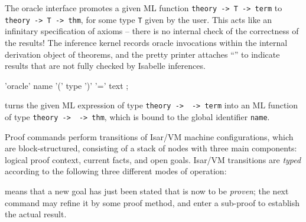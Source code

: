 \begin{isabellebody}
\begin{isamarkuptext}
  The oracle interface promotes a given ML function \verb|theory -> T -> term| to \verb|theory -> T -> thm|, for some
  type \verb|T| given by the user.  This acts like an infinitary
  specification of axioms -- there is no internal check of the
  correctness of the results!  The inference kernel records oracle
  invocations within the internal derivation object of theorems, and
  the pretty printer attaches ``\isa{{\isachardoublequote}{\isacharbrackleft}{\isacharbang}{\isacharbrackright}{\isachardoublequote}}'' to indicate results
  that are not fully checked by Isabelle inferences.

  \begin{rail}
    'oracle' name '(' type ')' '=' text
    ;
  \end{rail}

  \begin{descr}

  \item [\mbox{\isa{\isacommand{oracle}}}~\isa{{\isachardoublequote}name\ {\isacharparenleft}type{\isacharparenright}\ {\isacharequal}\ text{\isachardoublequote}}] turns the
  given ML expression  of type
  \verb|theory ->|~~\verb|-> term| into an
  ML function of type
  \verb|theory ->|~~\verb|-> thm|, which is
  bound to the global identifier \verb|name|.

  \end{descr}%
\end{isamarkuptext}%
\isamarkuptrue%
%
\isamarkuptrue%
%
\begin{isamarkuptext}%
Proof commands perform transitions of Isar/VM machine
  configurations, which are block-structured, consisting of a stack of
  nodes with three main components: logical proof context, current
  facts, and open goals.  Isar/VM transitions are \emph{typed}
  according to the following three different modes of operation:

  \begin{descr}

  \item [\isa{{\isachardoublequote}proof{\isacharparenleft}prove{\isacharparenright}{\isachardoublequote}}] means that a new goal has just been
  stated that is now to be \emph{proven}; the next command may refine
  it by some proof method, and enter a sub-proof to establish the
  actual result.


\end{descr}
\end{isamarkuptext}
\end{isabellebody}

